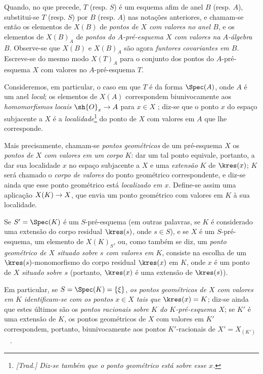 \documentclass[oneside]{amsart}
\makeatletter
\newcommand{\ega@arrow}[2]{\mathchoice{#1}{#2}{#2}{#2}}
\renewcommand{\to}{\ega@arrow{\longrightarrow}{\rightarrow}}
\newcommand{\oldpage}[2][]{{\marginnote{\normalfont\textbf{#1}~|~#2}}\ignorespaces}
\let\EGAOriginalLabel\label
\renewcommand{\label}[1]{\phantomsection\EGAOriginalLabel{#1}}
\makeatother
\begin{document}
\begin{env}[3.4.4]
\label{I.3.4.4}
Quando, no que precede, $T$ (resp. $S$) é um esquema afim de anel $B$
(resp. $A$), substitui-se $T$ (resp. $S$) por $B$ (resp. $A$) nas notações
anteriores, e chamam-se então os elementos de $X(B)$ de \emph{pontos de $X$
com valores no anel $B$}, e os elementos de $X(B)_A$ de \emph{pontos do
$A$-pré-esquema $X$ com valores na $A$-álgebra $B$}. Observe-se que $X(B)$ e
$X(B)_A$ são agora \emph{funtores covariantes em $B$}. Escreve-se do mesmo
modo $X(T)_A$ para o conjunto dos pontos do $A$-pré-esquema $X$ com valores
no $A$-pré-esquema $T$.
\end{env}

\begin{env}[3.4.5]
\label{I.3.4.5}
Consideremos, em particular, o caso em que $T$ é da forma $\Spec(A)$, onde
$A$ é um anel \emph{local}; os elementos de $X(A)$ correspondem
biunivocamente aos \emph{homomorfismos locais} $\sh{O}_x\to A$ para $x\in X$
; diz-se que o ponto $x$ do espaço subjacente a $X$ é a
\emph{localidade}\footnote{\emph{[Trad.] Diz-se também que o ponto geométrico
está sobre esse $x$.}} do ponto de $X$ com valores em $A$ que lhe corresponde.

Mais precisamente, chamam-se \emph{pontos geométricos} de um pré-esquema $X$
os \emph{pontos de $X$ com valores em um corpo $K$}: dar um tal ponto equivale,
portanto, a dar sua
\oldpage[I]{113}
localidade $x$ no espaço subjacente a $X$ e uma \emph{extensão} $K$ de
$\kres(x)$; $K$ será chamado o \emph{corpo de valores} do ponto geométrico
correspondente, e diz-se ainda que esse ponto geométrico está \emph{localizado
em $x$}. Define-se assim uma aplicação $X(K)\to X$, que envia um ponto
geométrico com valores em $K$ à sua localidade.

Se $S'=\Spec(K)$ é um $S$-pré-esquema (em outras palavras, se $K$ é
considerado uma extensão do corpo residual $\kres(s)$, onde $s\in S$), e se
$X$ é um $S$-pré-esquema, um elemento de $X(K)_S$, ou, como também se diz, um
\emph{ponto geométrico de $X$ situado sobre $s$ com valores em $K$}, consiste
na escolha de um $\kres(s)$-monomorfismo do corpo residual $\kres(x)$ em $K$,
onde $x$ é um ponto de $X$ \emph{situado sobre $s$} (portanto, $\kres(x)$ é
uma extensão de $\kres(s)$).

Em particular, se $S=\Spec(K)=\{\xi\}$, \emph{os pontos geométricos de $X$
com valores em $K$ identificam-se com os pontos $x\in X$ tais que
$\kres(x)=K$}; diz-se ainda que estes últimos são os \emph{pontos racionais
sobre $K$ do $K$-pré-esquema $X$}; se $K'$ é uma extensão de $K$, os
pontos geométricos de $X$ com valores em $K'$ correspondem, portanto,
biunivocamente aos pontos $K'$-racionais de $X'=X_{(K')}$~
.
\end{env}
\end{document}
